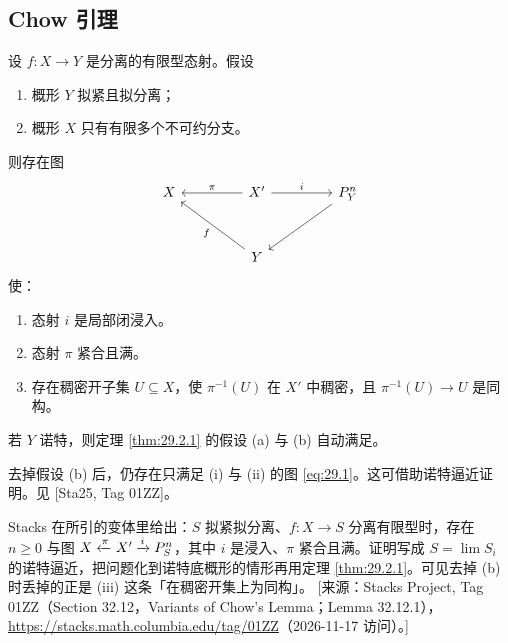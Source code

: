 \subsection{Chow 引理}\label{sec:29.2}

\begin{theorem}\label{thm:29.2.1}
设 $f\colon X\to Y$ 是分离的有限型态射。假设
\begin{enumerate}[label=(\alph*),leftmargin=2.6em,itemsep=0.25ex]
  \item 概形 $Y$ 拟紧且拟分离；
  \item 概形 $X$ 只有有限多个不可约分支。
\end{enumerate}
则存在图
\begin{equation}
\begin{tikzcd}[column sep=4.4em, row sep=3em]
X & X' \arrow[l, "\pi"'] \arrow[r, "i"] & \PP^n_Y \arrow[dl] \\
& Y \arrow[ul, "f"] &
\end{tikzcd}
\label{eq:29.1}
\end{equation}
使：
\begin{enumerate}[label=(\roman*),leftmargin=2.6em,itemsep=0.25ex]
  \item 态射 $i$ 是局部闭浸入。
  \item 态射 $\pi$ 紧合且满。
  \item 存在稠密开子集 $U\subseteq X$，使 $\pi^{-1}(U)$ 在 $X'$ 中稠密，且 $\pi^{-1}(U)\to U$ 是同构。
\end{enumerate}
\end{theorem}

\begin{remark}\label{rem:29.2.2}
若 $Y$ 诺特，则定理 \ref{thm:29.2.1} 的假设 (a) 与 (b) 自动满足。

去掉假设 (b) 后，仍存在只满足 (i) 与 (ii) 的图 \eqref{eq:29.1}。这可借助诺特逼近证明。见 [Sta25, Tag 01ZZ]。
\end{remark}

\begin{yizhu}
Stacks 在所引的变体里给出：$S$ 拟紧拟分离、$f\colon X\to S$ 分离有限型时，存在 $n\ge 0$ 与图 $X\xleftarrow{\pi}X'\xrightarrow{i}P^n_S$，其中 $i$ 是浸入、$\pi$ 紧合且满。证明写成 $S=\lim S_i$ 的诺特逼近，把问题化到诺特底概形的情形再用定理 \ref{thm:29.2.1}。可见去掉 (b) 时丢掉的正是 (iii) 这条「在稠密开集上为同构」。
[来源：Stacks Project, Tag 01ZZ（Section 32.12，Variants of Chow's Lemma；Lemma 32.12.1），\url{https://stacks.math.columbia.edu/tag/01ZZ}（2026-11-17 访问）。]
\end{yizhu}

